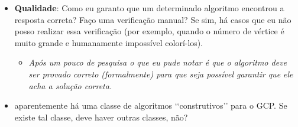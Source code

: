 \documentclass[a4paper,12pt]{article}
\begin{document}
\begin{itemize}
\item \textbf{Qualidade}: Como eu garanto que um determinado algoritmo encontrou a resposta correta? Faço uma verificação manual? Se sim, há casos que eu não posso realizar essa verificação (por exemplo, quando o número de vértice é muito grande e humanamente impossível colorí-los).
  \begin{itemize}
  \item \textit{Após um pouco de pesquisa o que eu pude notar é que o algoritmo deve ser provado correto (formalmente) para que seja possível garantir que ele acha a solução correta.}
  \end{itemize}
\item aparentemente há uma classe de algoritmos \lq\lq{}construtivos\rq\rq{} para o GCP. Se existe tal classe, deve haver outras classes, não?
\end{itemize}

\nocite{*}


\end{document}
